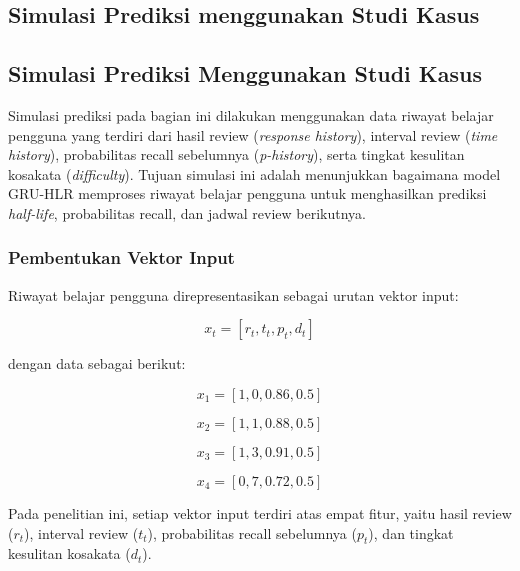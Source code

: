 
\subsection{Simulasi Prediksi menggunakan Studi Kasus}
\subsection{Simulasi Prediksi Menggunakan Studi Kasus}

Simulasi prediksi pada bagian ini dilakukan menggunakan data riwayat belajar pengguna yang terdiri dari hasil review (\textit{response history}), interval review (\textit{time history}), probabilitas recall sebelumnya (\textit{p-history}), serta tingkat kesulitan kosakata (\textit{difficulty}). Tujuan simulasi ini adalah menunjukkan bagaimana model GRU-HLR memproses riwayat belajar pengguna untuk menghasilkan prediksi \textit{half-life}, probabilitas recall, dan jadwal review berikutnya.

\subsubsection{Pembentukan Vektor Input}

Riwayat belajar pengguna direpresentasikan sebagai urutan vektor input:

\begin{equation}
x_t=[r_t,t_t,p_t,d_t]
\end{equation}

dengan data sebagai berikut:

\begin{equation}
x_1=[1,0,0.86,0.5]
\end{equation}

\begin{equation}
x_2=[1,1,0.88,0.5]
\end{equation}

\begin{equation}
x_3=[1,3,0.91,0.5]
\end{equation}

\begin{equation}
x_4=[0,7,0.72,0.5]
\end{equation}

Pada penelitian ini, setiap vektor input terdiri atas empat fitur, yaitu hasil review ($r_t$), interval review ($t_t$), probabilitas recall sebelumnya ($p_t$), dan tingkat kesulitan kosakata ($d_t$).

